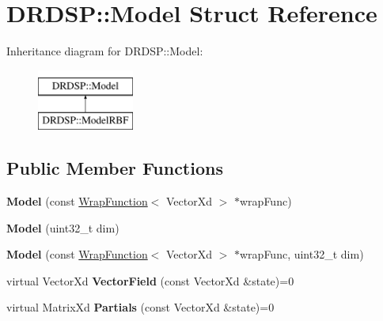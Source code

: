 \hypertarget{struct_d_r_d_s_p_1_1_model}{\section{D\-R\-D\-S\-P\-:\-:Model Struct Reference}
\label{struct_d_r_d_s_p_1_1_model}
}
Inheritance diagram for D\-R\-D\-S\-P\-:\-:Model\-:\begin{figure}[H]
\begin{center}
\leavevmode
\includegraphics[height=2.000000cm]{struct_d_r_d_s_p_1_1_model}
\end{center}
\end{figure}
\subsection*{Public Member Functions}
\begin{DoxyCompactItemize}
\item 
\hypertarget{struct_d_r_d_s_p_1_1_model_af9ab80237f807fecc435534c8705ea8c}{{\bfseries Model} (const \hyperlink{struct_d_r_d_s_p_1_1_wrap_function}{Wrap\-Function}$<$ Vector\-Xd $>$ $\ast$wrap\-Func)}\label{struct_d_r_d_s_p_1_1_model_af9ab80237f807fecc435534c8705ea8c}

\item 
\hypertarget{struct_d_r_d_s_p_1_1_model_a79dabe991f920ca21ac23066270ab1b7}{{\bfseries Model} (uint32\-\_\-t dim)}\label{struct_d_r_d_s_p_1_1_model_a79dabe991f920ca21ac23066270ab1b7}

\item 
\hypertarget{struct_d_r_d_s_p_1_1_model_a6e682e5b23ddca692c45a3bc6be9dd15}{{\bfseries Model} (const \hyperlink{struct_d_r_d_s_p_1_1_wrap_function}{Wrap\-Function}$<$ Vector\-Xd $>$ $\ast$wrap\-Func, uint32\-\_\-t dim)}\label{struct_d_r_d_s_p_1_1_model_a6e682e5b23ddca692c45a3bc6be9dd15}

\item 
\hypertarget{struct_d_r_d_s_p_1_1_model_a3dd65a7f5c3b1e5e89920a309ff2abec}{virtual Vector\-Xd {\bfseries Vector\-Field} (const Vector\-Xd \&state)=0}\label{struct_d_r_d_s_p_1_1_model_a3dd65a7f5c3b1e5e89920a309ff2abec}

\item 
\hypertarget{struct_d_r_d_s_p_1_1_model_a36f5e07d59e484b0ddfc12ed820e55d1}{virtual Matrix\-Xd {\bfseries Partials} (const Vector\-Xd \&state)=0}\label{struct_d_r_d_s_p_1_1_model_a36f5e07d59e484b0ddfc12ed820e55d1}

\end{DoxyCompactItemize}
